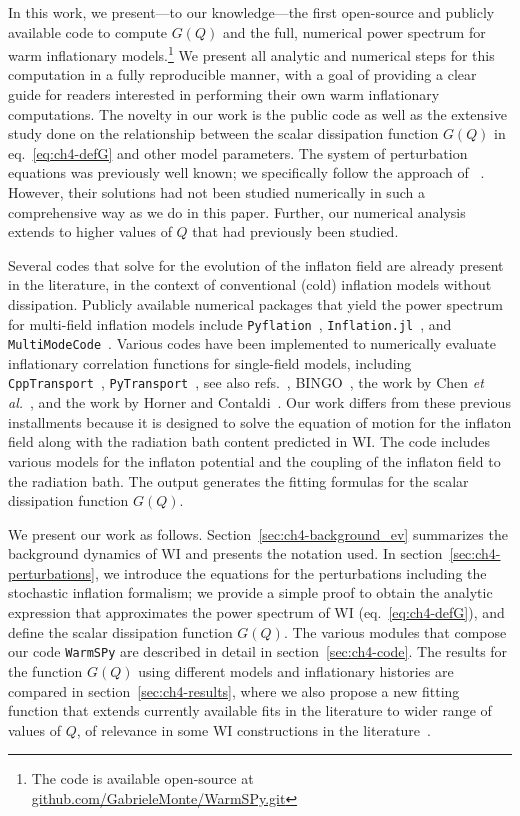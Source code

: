 In this work, we present—to our knowledge—the first open-source and publicly available code to compute $G(Q)$ and the full, numerical power spectrum for warm inflationary models.\footnote{The code is available open-source at \href{https://github.com/GabrieleMonte/WarmSPy.git}{github.com/GabrieleMonte/WarmSPy.git}} We present all analytic and numerical steps for this computation in a fully reproducible manner, with a goal of providing a clear guide for readers interested in performing their own warm inflationary computations. The novelty in our work is the public code as well as the extensive study done on the relationship between the scalar dissipation function $G(Q)$ in eq.~\eqref{eq:ch4-defG} and other model parameters. The  system of perturbation equations was previously well known; we specifically follow the approach of ~\cite{Ramos:2013nsa}.  
However, their solutions had not been studied numerically in such a comprehensive way as we do in this paper.  Further, our numerical analysis extends to higher values of $Q$ that had previously been studied.

Several codes that solve for the evolution of the inflaton field are already present in the literature, in the context of conventional (cold) inflation models without dissipation. Publicly available numerical packages that yield the power spectrum for  multi-field inflation models include {\tt Pyflation}~\cite{huston:2011vt}, \texttt{Inflation.jl}~\cite{rosati_robert_2020_4708348}, and {\tt MultiModeCode}~\cite{price:2014xpa}. Various codes have been implemented to numerically evaluate inflationary correlation functions for single-field models, including {\tt CppTransport}~\cite{seery:2016lko}, {\tt PyTransport}~\cite{mulryne:2016mzv}, see also refs.~\cite{dias:2016rjq, ronayne:2017qzn}, BINGO~\cite{hazra:2012yn}, the work by Chen {\it et al.}~\cite{chen:2006xjb}, and the work by Horner and Contaldi~\cite{horner:2013sea}. Our work differs from these previous installments because it is designed to solve the equation of motion for the inflaton field along with the radiation bath content predicted in WI. The code includes various models for the inflaton potential and the coupling of the inflaton field to the radiation bath. The output generates the fitting formulas for the scalar dissipation function $G(Q)$.

We present our work as follows. Section~\ref{sec:ch4-background_ev} summarizes the background dynamics of WI and presents the notation used. In section~\ref{sec:ch4-perturbations}, we introduce the equations for the perturbations including the stochastic inflation formalism; we provide a simple proof to obtain the analytic expression that approximates the power spectrum of WI (eq.~\eqref{eq:ch4-defG}), and define the scalar dissipation function $G(Q)$. The various modules that compose our code \texttt{WarmSPy} are described in detail in section~\ref{sec:ch4-code}. The results for the function $G(Q)$ using different models and inflationary histories are compared in section~\ref{sec:ch4-results}, where we also propose a new fitting function that extends currently available fits in the literature to wider range of values of $Q$, of relevance in some WI constructions in the literature~\cite{Das:2020xmh,Berghaus:2019whh,Bastero-Gil:2019gao}.

